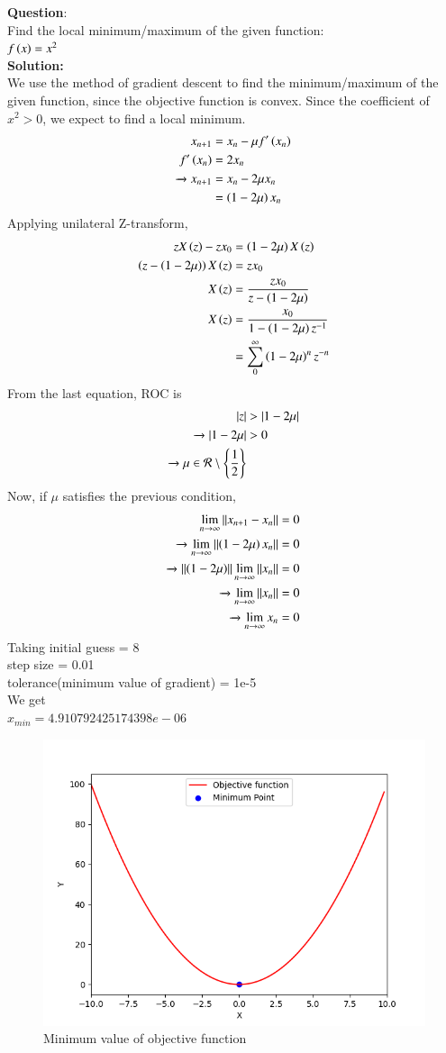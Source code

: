 \documentclass[journal]{IEEEtran}
\begin{document}
\textbf{Question}:\\
Find the local minimum/maximum of the given function:\\
$f\left(x\right) = x^2$
\\
\textbf{Solution: }\\
We use the method of gradient descent to find the minimum/maximum of the given function, since the objective function is convex.
Since the coefficient of $x^2 > 0$, we expect to find a local minimum.
\begin{align}
    x_{n+1} &= x_n - \mu f^{\prime}\left(x_n\right)\\
    f^{\prime}\left(x_n\right) &= 2x_n\\
    \xrightarrow{} x_{n+1} &= x_n - 2\mu x_n \\
    &= \left(1-2\mu\right)x_n
\end{align}
Applying unilateral Z-transform,
\begin{align}
    zX\left(z\right) - zx_0 &= \left(1-2\mu\right)X\left(z\right)\\
    \left(z - \left(1-2\mu\right)\right)X\left(z\right) &= zx_0\\
    X\left(z\right) &= \frac{zx_0}{z - \left(1-2\mu\right)}\\
    X\left(z\right) &= \frac{x_0}{1 - \left(1-2\mu\right)z^{-1}}\\
    &= \sum_{0}^{\infty} \left(1-2\mu\right)^n z^{-n}
\end{align}
From the last equation, ROC is 
\begin{align}
    |z| &> |1-2\mu|\\
    \xrightarrow{} |1-2\mu| &> 0\\
    \xrightarrow{} \mu \in \mathcal{R} \setminus \left\{\frac{1}{2}\right\}
\end{align}
Now, if $\mu$ satisfies the previous condition,
\begin{align}
    \lim_{n \to \infty} \left\lVert x_{n+1} - x_n\right\rVert = 0\\
    \xrightarrow{} \lim_{n \to \infty} \left\lVert\left(1-2\mu\right)x_n\right\rVert = 0\\
    \xrightarrow{} \left\lVert\left(1-2\mu\right)\right\rVert\lim_{n \to \infty} \left\lVert x_n\right\rVert = 0\\
    \xrightarrow{} \lim_{n \to \infty} \left\lVert x_n\right\rVert = 0\\
    \xrightarrow{} \lim_{n \to \infty} x_n = 0
\end{align}
Taking initial guess = 8\\ step size = 0.01\\ tolerance(minimum value of gradient) = 1e-5\\ We get \\
$x_{min} = 4.910792425174398e-06$
\begin{figure}[h!]
   \centering
   \includegraphics[width=0.7\columnwidth]{figs/fig.png}
    \caption{Minimum value of objective function}
\end{figure}
\end{document}

